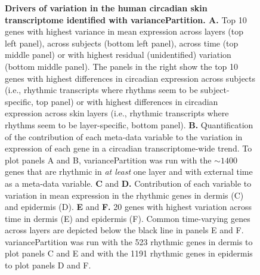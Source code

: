 {\begin{figure}[!]
	\begin{center}
		\caption{\textbf{Drivers of variation in the human circadian skin transcriptome identified with variancePartition. A.} Top 10 genes with highest variance in mean expression across layers (top left panel), across subjects (bottom left panel), across time (top middle panel) or with highest residual (unidentified) variation (bottom middle panel). The panels in the right show the top 10 genes with highest differences in circadian expression across subjects (i.e., rhythmic transcripts where rhythms seem to be subject-specific, top panel) or with highest differences in circadian expression across skin layers (i.e., rhythmic transcripts where rhythms seem to be layer-specific, bottom panel). \textbf{B.} Quantification of the contribution of each meta-data variable to the variation in expression of each gene in a circadian transcriptome-wide trend. To plot panels A and B, variancePartition was run with the $\sim1400$ genes that are rhythmic in \textit{at least} one layer and with external time as a meta-data variable. \textbf{C} and \textbf{D.} Contribution of each variable to variation in mean expression in the rhythmic genes in dermis (C) and epidermis (D). \textbf{E} and \textbf{F. } 20 genes with highest variation across time in dermis (E) and epidermis (F). Common time-varying genes across layers are depicted below the black line in panels E and F. variancePartition was run with the 523 rhythmic genes in dermis to plot panels C and E and with the 1191 rhythmic genes in epidermis to plot panels D and F.}
		

\end{center}
\end{figure}}
